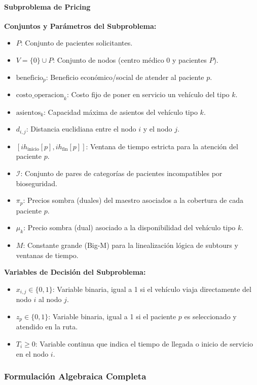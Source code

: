 \documentclass[12pt]{article}
\numberwithin{algorithm}{section}
\begin{document}
\paragraph{Subproblema de Pricing}

\textbf{Conjuntos y Parámetros del Subproblema:}
\begin{itemize}
    \item $P$: Conjunto de pacientes solicitantes.
    \item $V = \{0\} \cup P$: Conjunto de nodos (centro médico $0$ y pacientes $P$).
    \item $\text{beneficio}_p$: Beneficio económico/social de atender al paciente $p$.
    \item $\text{costo\_operacion}_k$: Costo fijo de poner en servicio un vehículo del tipo $k$.
    \item $\text{asientos}_k$: Capacidad máxima de asientos del vehículo tipo $k$.
    \item $d_{i,j}$: Distancia euclidiana entre el nodo $i$ y el nodo $j$.
    \item $[ih_{\text{inicio}}[p], ih_{\text{fin}}[p]]$: Ventana de tiempo estricta para la atención del paciente $p$.
    \item $\mathcal{I}$: Conjunto de pares de categorías de pacientes incompatibles por bioseguridad.
    \item $\pi_p$: Precios sombra (duales) del maestro asociados a la cobertura de cada paciente $p$.
    \item $\mu_k$: Precio sombra (dual) asociado a la disponibilidad del vehículo tipo $k$.
    \item $M$: Constante grande (Big-M) para la linealización lógica de subtours y ventanas de tiempo.
\end{itemize}

\textbf{Variables de Decisión del Subproblema:}
\begin{itemize}
    \item $x_{i,j} \in \{0, 1\}$: Variable binaria, igual a 1 si el vehículo viaja directamente del nodo $i$ al nodo $j$.
    \item $z_p \in \{0, 1\}$: Variable binaria, igual a 1 si el paciente $p$ es seleccionado y atendido en la ruta.
    \item $T_i \geq 0$: Variable continua que indica el tiempo de llegada o inicio de servicio en el nodo $i$.
\end{itemize}

\subsubsection{Formulación Algebraica Completa}
\end{document}
